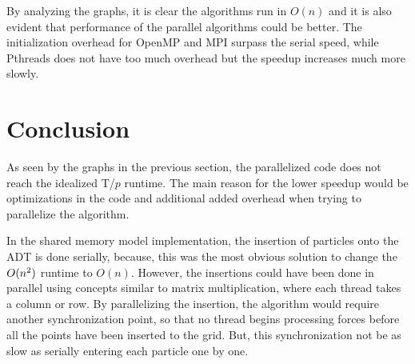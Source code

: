 \documentclass[12pt,a4paper]{article}
\begin{document}


By analyzing the graphs, it is clear the algorithms run in $O(n)$ and it is also evident that performance of the parallel algorithms could be better. The initialization overhead for OpenMP and MPI surpass the serial speed, while Pthreads does not have too much overhead but the speedup increases much more slowly. 


\section{Conclusion}

As seen by the graphs in the previous section, the parallelized code does not reach the idealized T/$p$ runtime. The main reason for the lower speedup would be optimizations in the code and additional added overhead when trying to parallelize the algorithm. 

In the shared memory model implementation, the insertion of particles onto the ADT is done serially, because, this was the most obvious solution to change the $O(n\textsuperscript{2})$ runtime to $O(n)$. However, the insertions could have been done in parallel using concepts similar to matrix multiplication, where each thread takes a column or row. By parallelizing the insertion, the algorithm would require another synchronization point, so that no thread begins processing forces before all the points have been inserted to the grid. But, this synchronization not be as slow as serially entering each particle one by one. 
\end{document}
